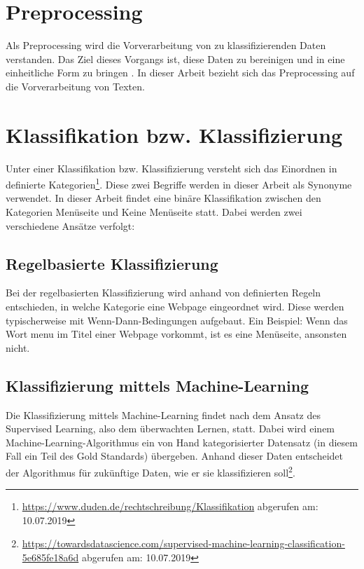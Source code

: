 \section{Preprocessing}
Als Preprocessing wird die Vorverarbeitung von zu klassifizierenden Daten verstanden.
Das Ziel dieses Vorgangs ist, diese Daten zu bereinigen und in eine einheitliche Form zu bringen \cite[p.155]{liu2007web}.
In dieser Arbeit bezieht sich das Preprocessing auf die Vorverarbeitung von Texten.
\section{Klassifikation bzw. Klassifizierung}
Unter einer Klassifikation bzw. Klassifizierung versteht sich das Einordnen in definierte Kategorien\footnote{\url{https://www.duden.de/rechtschreibung/Klassifikation} abgerufen am: 10.07.2019}.
Diese zwei Begriffe werden in dieser Arbeit als Synonyme verwendet.
In dieser Arbeit findet eine binäre Klassifikation zwischen den Kategorien \glqq Menüseite\grqq{} und \glqq Keine Menüseite\grqq{} statt.
Dabei werden zwei verschiedene Ansätze verfolgt:
\subsection{Regelbasierte Klassifizierung}
Bei der regelbasierten Klassifizierung wird anhand von definierten Regeln entschieden, in welche Kategorie eine Webpage eingeordnet wird.
Diese werden typischerweise mit \glqq Wenn-Dann\grqq-Bedingungen aufgebaut.
Ein Beispiel: Wenn das Wort \glqq menu\grqq{} im Titel einer Webpage vorkommt, ist es eine Menüseite, ansonsten nicht.
\subsection{Klassifizierung mittels Machine-Learning}
Die Klassifizierung mittels Machine-Learning findet nach dem Ansatz des \glqq Supervised Learning\grqq{}, also dem überwachten Lernen, statt.
Dabei wird einem Machine-Learning-Algorithmus ein von Hand kategorisierter Datensatz (in diesem Fall ein Teil des Gold Standards) übergeben.
Anhand dieser Daten entscheidet der Algorithmus für zukünftige Daten, wie er sie klassifizieren soll\footnote{\url{https://towardsdatascience.com/supervised-machine-learning-classification-5e685fe18a6d} abgerufen am: 10.07.2019}.
